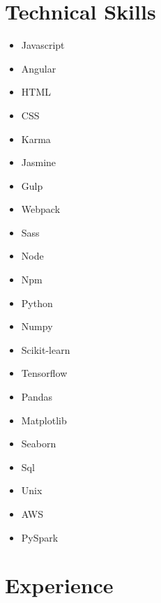 \documentclass[10pt]{article}
\begin{document}
	\section{Technical Skills}
		\begin{multicols}{4}
			\begin{itemize}[noitemsep]
				\item Javascript 
				\item Angular 
				\item HTML 
				\item CSS 
				\item Karma 
				\item Jasmine 
				\columnbreak 
				
				\item Gulp 
				\item Webpack
				\item Sass
				\item Node 
				\item Npm 
				\item Python 
				\columnbreak 
				
				\item Numpy 
				\item Scikit-learn 
				\item Tensorflow 
				\item Pandas 
				\item Matplotlib
				\item Seaborn 
				\columnbreak
				
				\item Sql 
				\item Unix 
				\item AWS 
				\item PySpark
			\end{itemize}
		\end{multicols}
		
	\section{Experience}
\end{document}
